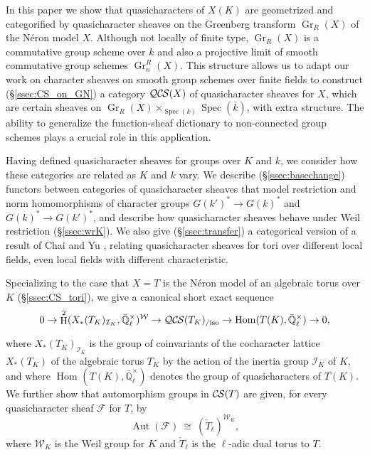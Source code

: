 \documentclass[10pt]{amsart}
\theoremstyle{plain}
\theoremstyle{definition}
\newcommand{\EE}{\mathbb{\bar Q}_\ell}
\newcommand{\bFq}{\bar{k}}
\newcommand{\Fq}{k}
\newcommand{\EEx}{\EE^\times}
\newcommand{\Weil}[1]{\mathcal{W}_{#1}}
\DeclareMathOperator{\Aut}{Aut}
\DeclareMathOperator{\Hom}{Hom}
\DeclareMathOperator{\Gr}{Gr}
\DeclareMathOperator{\Hh}{H}
\newcommand{\Spec}[1]{{\operatorname{Spec}(#1)}}
\newcommand{\iso}{{\ \cong\ }}
\newcommand{\cs}[1]{{\mathcal{#1}}}
\newcommand{\CS}{{\mathcal{C\hskip-0.8pt S}}}
\newcommand{\QCS}{{\mathcal{QC\hskip-0.8pt S}}}
\newcommand{\QCSiso}[1]{\QCS(#1)_{/\text{iso}}}
\begin{document}
In this paper we show that quasicharacters of $X(K)$ are geometrized and categorified by quasicharacter sheaves on the
Greenberg transform $\Gr_R(X)$ of the N\'eron model $X$.
Although not locally of finite type, $\Gr_R(X)$ is a commutative group scheme over $\Fq$ and also a projective limit of smooth commutative group schemes $\Gr^R_n(X)$.
This structure allows us to adapt our work on character sheaves on smooth group schemes over finite fields to construct (\S\ref{ssec:CS_on_GN}) a category $\QCS(X)$
of quasicharacter sheaves for $X$, which are certain sheaves on $\Gr_R(X)\times_{\Spec{\Fq}} \Spec{\bFq}$, with extra structure.
The ability to generalize the function-sheaf dictionary to non-connected group schemes plays a crucial role in this application.

Having defined quasicharacter sheaves for groups over $K$ and $\Fq$, we consider how
these categories are related as $K$ and $\Fq$ vary.  We describe (\S\ref{ssec:basechange}) functors between categories
of quasicharacter sheaves that model restriction and norm homomorphisms of character groups $G(k')^* \to G(k)^*$ and $G(k)^* \to G(k')^*$,
and describe how quasicharacter sheaves behave under Weil restriction (\S\ref{ssec:wrK}).  We also give (\S\ref{ssec:transfer})
a categorical version of a result of Chai and Yu \cite{chai-yu:01a},
relating quasicharacter sheaves for tori over different local fields, even local fields
with different characteristic.

Specializing to the case that $X = T$ is the N\'eron model of an algebraic torus over $K$ (\S\ref{ssec:CS_tori}), 
we give a canonical short exact sequence 
\[
0 \to \Hh^2(X_*(T_K)_{\mathcal{I}_K},\EEx)^{\Weil{}} \to \QCSiso{T_K} \to \Hom_\text{}(T(K),\EEx) \to 0,
\]
where $X_*(T_K)_{\mathcal{I}_K}$ is the group of coinvariants of the cocharacter lattice $X_*(T_K)$ of the algebraic torus $T_K$ by the action of the inertia group $\mathcal{I}_K$ of $K$, and where $\Hom_\text{}(T(K),\EEx)$ denotes the group of quasicharacters of $T(K)$.
We further show that automorphism groups in $\CS(T)$ are given, for every quasicharacter sheaf $\cs{F}$ for $T$, by
\[
\Aut(\cs{F}) \iso (\check{T}_\ell)^{\Weil{K}},
\]
where $\Weil{K}$ is the Weil group for $K$ and $\check{T}_\ell$ is the $\ell$-adic dual torus to $T$.
\end{document}
